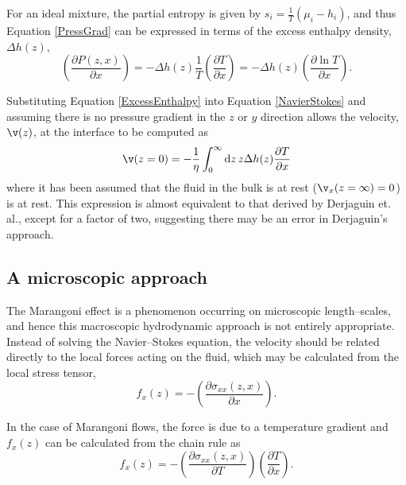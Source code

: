 For an ideal mixture, the partial entropy is given by $s_{i}=\frac{1}{T} \left(\mu_{i}-h_{i} \right)$, and thus Equation \ref{PressGrad} can be expressed in terms of the excess enthalpy density, $\Delta h(z)$,
\begin{equation}
\label{ExcessEnthalpy}
\left(\frac{\partial P(z,x)}{\partial x}\right)= - \Delta h(z)\frac{1}{T} \left( \frac{\partial T}{\partial x} \right) 
= - \Delta h(z) \left( \frac{\partial \ln T}{\partial x} \right).
\end{equation}

Substituting Equation \ref{ExcessEnthalpy} into Equation \ref{NavierStokes} and assuming there is no pressure gradient in the $z$ or $y$ direction allows the velocity, $\v(z)$, at the interface to be computed as
\begin{equation}
\label{DoubleIntegral}
\v (z=0) = - \frac{1}{\eta}\int_{0}^{\infty} \mathrm{d}z\, z \Delta h(z) \frac{\partial T}{\partial x}
\end{equation}
where it has been assumed that the fluid in the bulk is at rest ($\v_{x}(z=\infty)=0$) is at rest.
This expression is almost equivalent to that derived by Derjaguin et. al., except for a factor of two, suggesting there may be an error in Derjaguin's approach.\cite{SurfaceForces, Anderson}

\subsection{A microscopic approach}
The Marangoni effect is a phenomenon occurring on microscopic length--scales, and hence this macroscopic hydrodynamic approach is not entirely appropriate.
Instead of solving the Navier--Stokes equation, the velocity should be related directly to the local forces acting on the fluid, which may be calculated from the local stress tensor,
\begin{equation}
\label{ForceStress}
f_{x}(z) = - \left( \frac{\partial \sigma_{xx}(z,x)}{\partial x} \right).
\end{equation}

In the case of Marangoni flows, the force is due to a temperature gradient and $f_{x}(z)$ can be calculated from the chain rule as
\begin{equation}
\label{ForceStressTemp}
f_{x}(z) = - \left( \frac{\partial \sigma_{xx}(z,x)}{\partial T} \right) \left( \frac{\partial T}{\partial x} \right).
\end{equation}

